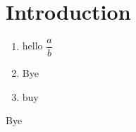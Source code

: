 \documentclass[xcolor=dvipsnames, aspectratio=169, 10pt]{beamer}
\begin{document}
\TitlePage
\SectionPage
\SubsectionPage
\ProgressBar
\PageNumbering
\section{Introduction}
\begin{frame}
	\begin{enumerate}
		\item hello $\dfrac{a}{b}$
		\item Bye
		\item buy
	\end{enumerate}
\end{frame}

\begin{frame}
	Bye
\end{frame}
\end{document}
